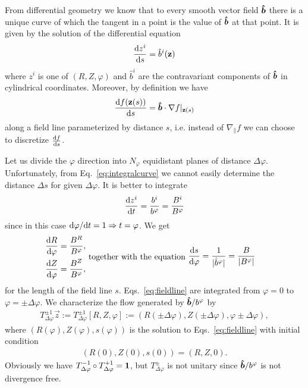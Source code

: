 From differential geometry we 
know that to every smooth vector field $\bm{\hat{b}}$ there is a unique curve of which the
tangent in a point is the value of $\bm{\hat{b}}$ at that point. It is given by
the solution of the differential equation
\begin{align}
    \frac{\mathrm{d} z^i}{\mathrm{d} s} = \hat b^i({\mathbf{z}})
    \label{eq:integralcurve}
\end{align}
where $z^i$ is one of $(R, Z, \varphi)$ and $\hat b^i$ are the contravariant components
of $\bm{\hat{b}}$ in cylindrical coordinates. 
Moreover, by definition we have
\begin{align}
    \frac{\mathrm{d} f({\mathbf{z}}(s))}{\mathrm{d} s} = \bm{\hat{b}}\cdot \nabla f|_{{\mathbf{z}}(s)}
    \label{}
\end{align}
along a field line parameterized by distance $s$, 
i.e. instead of $\nabla_\parallel f$ we can choose to discretize $\frac{\mathrm{d} f}{\mathrm{d} s}$.

Let us divide the $\varphi$ direction into $N_\varphi$ equidistant planes of distance
$\Delta \varphi$. Unfortunately, from Eq.~\eqref{eq:integralcurve} we cannot easily determine the 
distance $\Delta s$ for given $\Delta \varphi$. It is better to integrate
\begin{align}
    \frac{\mathrm{d} z^i}{\mathrm{d} t}=\frac{b^i}{b^\varphi} = \frac{B^i}{B^\varphi}
    \label{}
\end{align}
since in this case $\mathrm{d}\varphi/\mathrm{d} t = 1 \Rightarrow t=\varphi$. We get
\begin{subequations}
\begin{align}
    \frac{\d R}{\d\varphi}&= \frac{B^R}{B^\varphi},\\ %
    \frac{\d Z}{\d\varphi}&=\frac{B^Z}{B^\varphi},%
\end{align}
\text{ together with the equation  }
\begin{align}
    \frac{\d s}{\d\varphi} &= \frac{1}{|\hat b^\varphi|} = \frac{B}{|B^\varphi|}%
    \label{eq:fieldlinec}
\end{align}
\label{eq:fieldline}
\end{subequations}
for the length of the field line $s$. 
Eqs.~\eqref{eq:fieldline} are integrated from $\varphi=0$ to $\varphi=\pm \Delta \varphi$. 
We characterize the flow generated by $\bm{\hat{b}}/b^\varphi$ by
\begin{align}
    T_{\Delta \varphi}^{\pm 1}\vec z := T_{\Delta \varphi}^{\pm 1}[R, Z, \varphi]:= ( R(\pm \Delta\varphi), Z( \pm \Delta\varphi), \varphi\pm\Delta \varphi),
    \label{}
\end{align}
where $(R(\varphi), Z(\varphi), s(\varphi))$ is the solution to Eqs.~\eqref{eq:fieldline} 
with initial condition 
\begin{align}
    (R(0), Z(0), s(0)) = (R, Z, 0).
    \label{}
\end{align} 
Obviously we have $T^{-1}_{\Delta\varphi}\circ T^{+1}_{\Delta\varphi} = \mathbf{1}$, but $T^{\pm}_{\Delta\varphi}$ is not unitary since $\bm{\hat{b}}/b^\varphi$ is 
not divergence free. 

